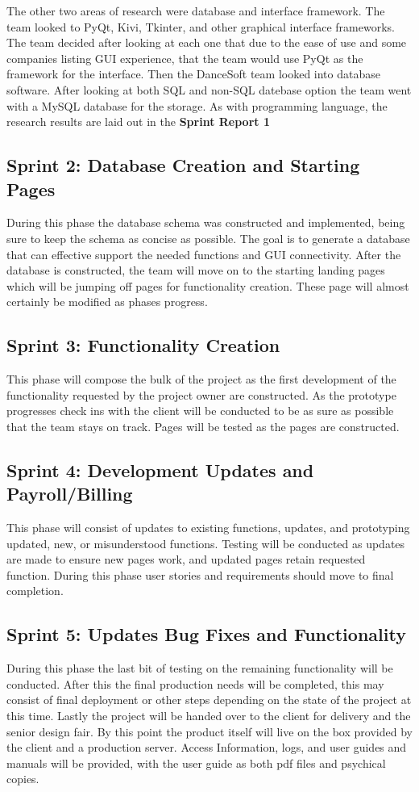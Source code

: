 The other two areas of research were database and interface framework. The team looked to PyQt, Kivi, Tkinter, and other graphical interface frameworks. The team decided after looking at each one that due to the ease of use and some companies listing GUI experience, that the team would use PyQt as the framework for the interface. Then the DanceSoft team looked into database software. After looking at both SQL and non-SQL datebase option the team went with a MySQL database for the storage. As with programming language, the research results are laid out in the \bf Sprint Report 1 \rm   

\subsection{Sprint 2: Database Creation and Starting Pages}
During this phase the database schema was constructed and implemented, being sure to keep the schema as concise as possible. The goal is to generate a database that can effective support the needed functions and GUI connectivity. After the database is constructed, the team will move on to the starting landing pages which will be jumping off pages for functionality creation. These page will almost certainly be modified as phases progress.

\subsection{Sprint 3: Functionality Creation }
This phase will compose the bulk of the project as the first development of the functionality requested by the project owner are constructed. As the prototype progresses check ins with the client will be conducted to be as sure as possible that the team stays on track. Pages will be tested as the pages are constructed.

\subsection{Sprint 4: Development Updates and Payroll/Billing}
This phase will consist of updates to existing functions, updates, and prototyping updated, new, or misunderstood functions. Testing will be conducted as updates are made to ensure new pages work, and updated pages retain requested function. During this phase user stories and requirements should move to final completion.

\subsection{Sprint 5: Updates Bug Fixes and Functionality}
During this phase the last bit of testing on the remaining functionality will be conducted. After this the final production needs will be completed, this may consist of final deployment or other steps depending on the state of the project at this time. Lastly the project will be handed over to the client for delivery and the senior design fair. By this point the product itself will live on the box provided by the client and a production server. Access Information, logs, and user guides and manuals will be provided, with the user guide as both pdf files and psychical copies.

